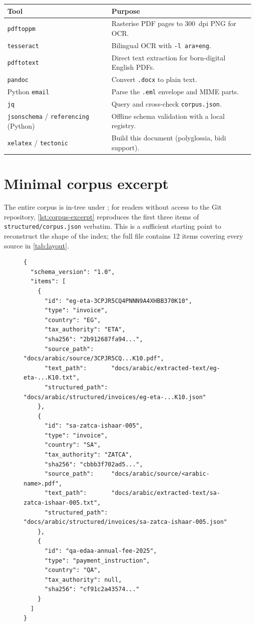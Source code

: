 \documentclass[11pt,a4paper,twoside]{report}
\newcommand{\corpus}{}
\begin{document}
\begin{tabularx}{\linewidth}{@{}l X@{}}
\toprule
\textbf{Tool} & \textbf{Purpose} \\ \midrule
\texttt{pdftoppm}    & Rasterise PDF pages to 300~dpi PNG for OCR. \\
\texttt{tesseract}   & Bilingual OCR with \texttt{-l ara+eng}. \\
\texttt{pdftotext}   & Direct text extraction for born-digital English PDFs. \\
\texttt{pandoc}      & Convert \texttt{.docx} to plain text. \\
Python \texttt{email}& Parse the \texttt{.eml} envelope and MIME parts. \\
\texttt{jq}          & Query and cross-check \texttt{corpus.json}. \\
\texttt{jsonschema} / \texttt{referencing} (Python) & Offline schema validation with a local registry. \\
\texttt{xelatex} / \texttt{tectonic} & Build this document (polyglossia, bidi support). \\
\bottomrule
\end{tabularx}

\section{Minimal corpus excerpt}

The entire corpus is in-tree under \corpus; for readers without
access to the Git repository, \cref{lst:corpus-excerpt} reproduces
the first three items of \corpus\texttt{structured/corpus.json}
verbatim. This is a sufficient starting point to reconstruct the
shape of the index; the full file contains 12 items covering every
source in \cref{tab:layout}.

\begin{figure}[htbp]
\begin{lstlisting}[language=jsonx,caption={First three items of
\texttt{corpus.json}; identical SHA-256 values are reproduced in
\cref{ch:references}.},label=lst:corpus-excerpt]
{
  "schema_version": "1.0",
  "items": [
    {
      "id": "eg-eta-3CPJR5CQ4PNNN9A4XHBB370K10",
      "type": "invoice",
      "country": "EG",
      "tax_authority": "ETA",
      "sha256": "2b912687fa94...",
      "source_path":     "docs/arabic/source/3CPJR5CQ...K10.pdf",
      "text_path":       "docs/arabic/extracted-text/eg-eta-...K10.txt",
      "structured_path": "docs/arabic/structured/invoices/eg-eta-...K10.json"
    },
    {
      "id": "sa-zatca-ishaar-005",
      "type": "invoice",
      "country": "SA",
      "tax_authority": "ZATCA",
      "sha256": "cbbb3f702ad5...",
      "source_path":     "docs/arabic/source/<arabic-name>.pdf",
      "text_path":       "docs/arabic/extracted-text/sa-zatca-ishaar-005.txt",
      "structured_path": "docs/arabic/structured/invoices/sa-zatca-ishaar-005.json"
    },
    {
      "id": "qa-edaa-annual-fee-2025",
      "type": "payment_instruction",
      "country": "QA",
      "tax_authority": null,
      "sha256": "cf91c2a43574..."
    }
  ]
}
\end{lstlisting}
\end{figure}
\end{document}
